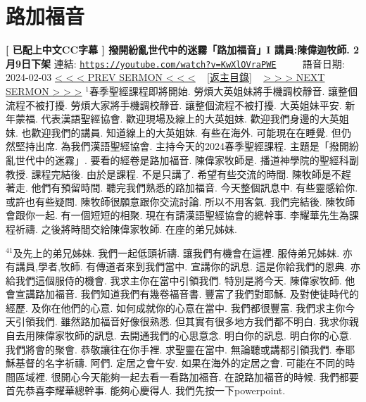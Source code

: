 \documentclass{book}
\begin{document}
\section{路加福音}
\label{sec:KwXlOVraPWE}
\textbf{[ 已配上中文CC字幕 ] 撥開紛亂世代中的迷霧「路加福音」I  講員:陳偉迦牧師. 2月9日下架}
\newline
\newline
連結: \href{https://youtube.com/watch?v=KwXlOVraPWE}{\texttt{https://youtube.com/watch?v=KwXlOVraPWE}} ~~~~ 語音日期: 2024-02-03
\newline
\newline
\hyperref[sec:5AhQhWw7knY]{\small{< < < PREV SERMON < < <}}
~
\hyperref[sec:index]{\small{[返主目錄]}}
~
\hyperref[sec:y7RfxilxFdE]{\small{> > > NEXT SERMON > > >}}
\newline
\newline
$^{1}$春季聖經課程即將開始.
勞煩大英姐妹將手機調校靜音.
讓整個流程不被打擾.
勞煩大家將手機調校靜音.
讓整個流程不被打擾.
大英姐妹平安.
新年蒙福.
代表漢語聖經協會.
歡迎現場及線上的大英姐妹.
歡迎我們身邊的大英姐妹.
也歡迎我們的講員.
知道線上的大英姐妹.
有些在海外.
可能現在在睡覺.
但仍然堅持出席.
為我們漢語聖經協會.
主持今天的2024春季聖經課程.
主題是「撥開紛亂世代中的迷霧」.
要看的經卷是路加福音.
陳偉家牧師是.
播道神學院的聖經科副教授.
課程完結後.
由於是課程.
不是只講了.
希望有些交流的時間.
陳牧師是不趕著走.
他們有預留時間.
聽完我們熟悉的路加福音.
今天整個訊息中.
有些靈感給你.
或許也有些疑問.
陳牧師很願意跟你交流討論.
所以不用客氣.
我們完結後.
陳牧師會跟你一起.
有一個短短的相聚.
現在有請漢語聖經協會的總幹事.
李耀華先生為課程祈禱.
之後將時間交給陳偉家牧師.
在座的弟兄姊妹.

$^{41}$及先上的弟兄姊妹.
我們一起低頭祈禱.
讓我們有機會在這裡.
服侍弟兄姊妹.
亦有講員,學者,牧師.
有傳道者來到我們當中.
宣講你的訊息.
這是你給我們的恩典.
亦給我們這個服侍的機會.
我求主你在當中引領我們.
特別是將今天.
陳偉家牧師.
他會宣講路加福音.
我們知道我們有幾卷福音書.
豐富了我們對耶穌.
及對使徒時代的經歷.
及你在他們的心意.
如何成就你的心意在當中.
我們都很豐富.
我們求主你今天引領我們.
雖然路加福音好像很熟悉.
但其實有很多地方我們都不明白.
我求你親自去用陳偉家牧師的訊息.
去開通我們的心思意念.
明白你的訊息.
明白你的心意.
我們將會的聚會.
恭敬讓往在你手裡.
求聖靈在當中.
無論聽或講都引領我們.
奉耶穌基督的名字祈禱.
阿們.
定居之會午安.
如果在海外的定居之會.
可能在不同的時間區域裡.
很開心今天能夠一起去看一看路加福音.
在說路加福音的時候.
我們都要首先恭喜李耀華總幹事.
能夠心慶得人.
我們先按一下powerpoint.
\end{document}
